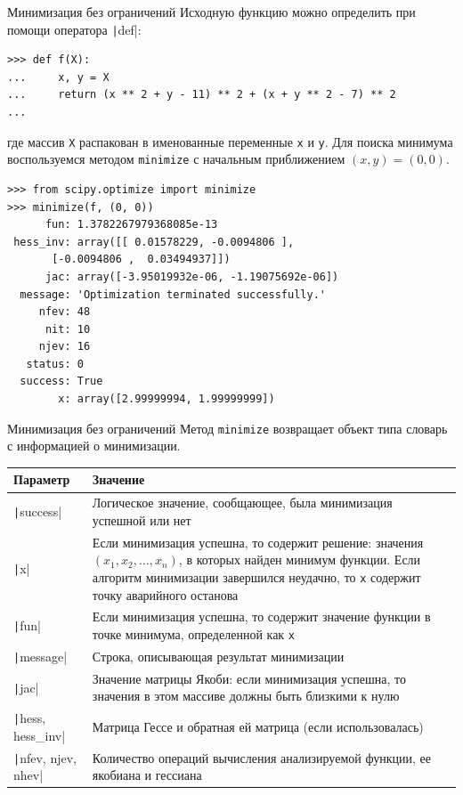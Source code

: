 \documentclass[aspectratio=169, mathserif]{beamer}	%
\begin{document}
\begin{frame}[fragile]{Минимизация без ограничений}
\scriptsize
Исходную функцию можно определить при помощи оператора \texttt|def|:
\vfill
\begin{verbatim}
>>> def f(X):
...     x, y = X
...     return (x ** 2 + y - 11) ** 2 + (x + y ** 2 - 7) ** 2
...
\end{verbatim}
\vfill
где массив \texttt{X} распакован в именованные переменные \texttt{x} и \texttt{y}.
\vfill
Для поиска минимума воспользуемся методом \texttt{minimize} с начальным приближением $\left(x, y\right) = \left(0, 0\right)$.
\vfill
\begin{verbatim}
>>> from scipy.optimize import minimize
>>> minimize(f, (0, 0))
      fun: 1.3782267979368085e-13
 hess_inv: array([[ 0.01578229, -0.0094806 ],
       [-0.0094806 ,  0.03494937]])
      jac: array([-3.95019932e-06, -1.19075692e-06])
  message: 'Optimization terminated successfully.'
     nfev: 48
      nit: 10
     njev: 16
   status: 0
  success: True
        x: array([2.99999994, 1.99999999])
\end{verbatim}
\vfill
\end{frame}


\begin{frame}[fragile]{Минимизация без ограничений}
\scriptsize
Метод \texttt{minimize} возвращает объект типа словарь с информацией о минимизации.
\begin{table}[h!]
\begin{tabular}{|p{}|p{}|}
\hline
\textbf{Параметр} & \textbf{Значение} \\
\hline
\texttt|success| & Логическое значение, сообщающее, была минимизация успешной или нет \\
\hline
\texttt|x| & Если минимизация успешна, то содержит решение: значения $\left(x_1, x_2, \ldots, x_n\right)$, в которых найден минимум функции. Если алгоритм минимизации завершился неудачно, то \texttt{x} содержит точку аварийного останова \\
\hline
\texttt|fun| & Если минимизация успешна, то содержит значение функции в точке минимума, определенной как \texttt{x} \\
\hline
\texttt|message| & Строка, описывающая результат минимизации \\
\hline
\texttt|jac| & Значение матрицы Якоби: если минимизация успешна, то значения в этом массиве должны быть близкими к нулю \\
\hline
\texttt|hess, hess_inv| & Матрица Гессе и обратная ей матрица (если использовалась) \\
\hline
\texttt|nfev, njev, nhev| & Количество операций вычисления анализируемой функции, ее якобиана и гессиана \\
\hline
\end{tabular}
\end{table}
\vfill
\end{frame}
\end{document}
